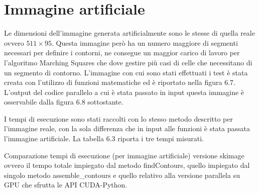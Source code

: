 \documentclass[12pt,a4paper]{report}
\begin{document}
{\section{Immagine artificiale}
Le dimensioni dell'immagine generata artificialmente sono le stesse di quella reale ovvero $511 \times 95$. Questa immagine però ha un numero maggiore di segmenti necessari per definire i contorni, ne consegue un maggior carico di lavoro per l'algoritmo Marching Squares che dove gestire più casi di celle che necessitano di un segmento di contorno. L'immagine con cui sono stati effettuati i test è stata creata con l'utilizzo di funzioni matematiche ed è riportato nella figura 6.7. L'output del codice parallelo a cui è stata passato in input questa immagine è osservabile dalla figura 6.8 sottostante.


\begin{figure}[H]
\centering
\begin{floatrow}[1]
\end{floatrow}
\end{figure} 

\begin{figure}[H]
\centering
\begin{floatrow}[1]
\end{floatrow}
\end{figure} 

I tempi di esecuzione sono stati raccolti con lo stesso metodo descritto per l'immagine reale, con la sola differenza che in input alle funzioni è stata passata l'immagine artificiale. La tabella 6.3 riporta i tre tempi misurati.

\begin{table}[H]
\centering
\setlength\tabcolsep{0pt} %
\caption{Comparazione tempi di esecuzione (per immagine artificiale) versione skimage ovvero il tempo totale impiegato dal metodo findContours, quello impiegato dal singolo metodo assemble\_contours e quello relativo alla versione parallela su GPU che sfrutta le API CUDA-Python.}
\label{t4}


\end{table}}
\end{document}
